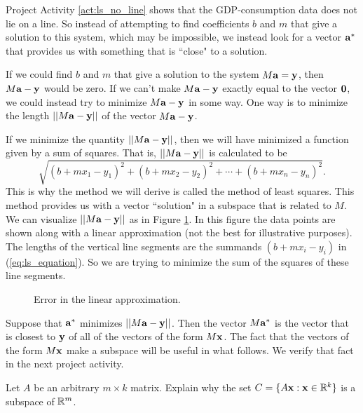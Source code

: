 Project Activity \ref{act:ls_no_line} shows that the GDP-consumption data does not lie on a line.  So instead of attempting to find coefficients $b$ and $m$ that give a solution to this system, which may be impossible, we instead look for a vector $\mathbf{a}^*$ that provides us with something that is ``close" to a solution.

If we could find $b$ and $m$ that give a solution to the system $M\mathbf{a} = \mathbf{y}$, then $M\mathbf{a} - \mathbf{y}$ would be zero. If we can't make $M\mathbf{a} - \mathbf{y}$ exactly equal to the vector $\mathbf{0}$, we could instead try to minimize $M\mathbf{a}-\mathbf{y}$ in some way. One way is to minimize the length $||M\mathbf{a}-\mathbf{y}||$ of the vector $M\mathbf{a} - \mathbf{y}$.

If we minimize the quantity $||M\mathbf{a}-\mathbf{y}||$, then we will have minimized a function given by a sum of squares. That is, $||M\mathbf{a}-\mathbf{y}||$ is calculated to be
\begin{equation}
 \sqrt{(b+mx_1-y_1)^2 + (b+mx_2-y_2)^2 + \cdots + (b+mx_n-y_n)^2}. \label{eq:ls_equation}
\end{equation}
This is why the method we will derive is called the method of least squares. This method provides us with a vector ``solution" in a subspace that is related to $M$. We can visualize $||M \mathbf{a} - \mathbf{y}||$ as in Figure \ref{F:GDP_error}. In this figure the data points are shown along with a linear approximation (not the best for illustrative purposes). The lengths of the vertical line segments are the summands $(b+mx_i-y_i)$ in (\ref{eq:ls_equation}). So we are trying to minimize the sum of the squares of these line segments. 
\begin{figure}[ht]
\begin{center}
\caption{Error in the linear approximation.}
\label{F:GDP_error}
\end{center}
\end{figure}

Suppose that $\mathbf{a}^*$ minimizes $||M \mathbf{a} - \mathbf{y}||$. Then the vector $M \mathbf{a}^*$ is the vector that is closest to $\mathbf{y}$ of all of the vectors of the form $M \mathbf{x}$. The fact that the vectors of the form $M \mathbf{x}$ make a subspace will be useful in what follows. We verify that fact in the next project activity.  

\begin{pactivity} \label{act:ls_subspace}  Let $A$ be an arbitrary $m \times k$ matrix. Explain why the set $C = \{A \mathbf{x} : \mathbf{x} \in \mathbb{R}^k\}$ is a subspace of $\mathbb{R}^m$. 


\end{pactivity}

